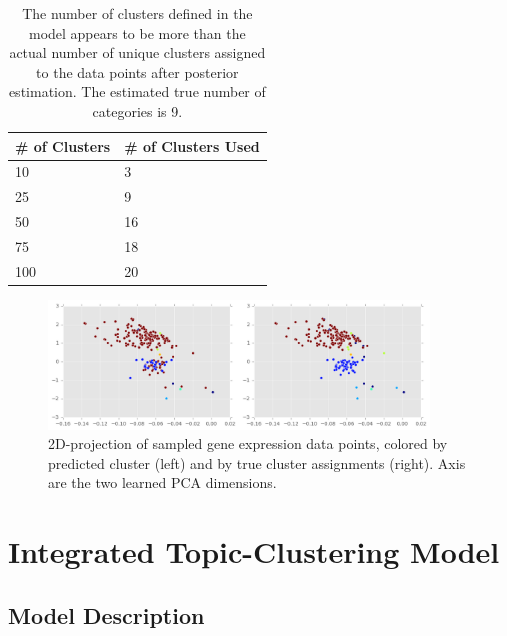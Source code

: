 \documentclass{article}
\begin{document}
\begin{table}[h]
    \centering
    \label{mmtable}
    \begin{tabular}{@{}ll@{}}
        \toprule
        \# of Clusters & \# of Clusters Used \\ \midrule
        10                 & 3                                                         \\
        25                 & 9                                                         \\
        50                 & 16                                                        \\
        75                 & 18                                                        \\
        100                & 20                                                        \\ \bottomrule
    \end{tabular}
    \caption{The number of clusters defined in the model appears to be more than the actual number of unique clusters assigned to the data points after posterior estimation. The estimated true number of categories is 9.}
\end{table}


\begin{figure}[ht]
    \centering
    \includegraphics[width=0.9\textwidth]{figs/totalclusters}
    \caption{2D-projection of sampled gene expression data points, colored by predicted cluster (left) and by true cluster assignments (right). Axis are the two learned PCA dimensions.}
    \label{fig:mmplot}
\vskip -0.2in
\end{figure}


\section{Integrated Topic-Clustering Model} 
\label{intsec}
\subsection{Model Description} 
\end{document}
